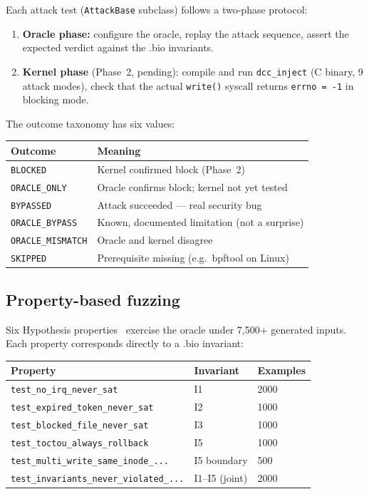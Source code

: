 \documentclass[11pt,a4paper]{article}
\theoremstyle{definition}
\begin{document}
Each attack test (\texttt{AttackBase} subclass) follows a two-phase protocol:

\begin{enumerate}
  \item \textbf{Oracle phase:} configure the oracle, replay the attack sequence,
        assert the expected verdict against the .bio invariants.
  \item \textbf{Kernel phase} (Phase~2, pending): compile and run
        \texttt{dcc\_inject} (C binary, 9 attack modes), check that the actual
        \texttt{write()} syscall returns \texttt{errno = -1} in blocking mode.
\end{enumerate}

The outcome taxonomy has six values:

\begin{center}
\begin{tabular}{ll}
\toprule
Outcome & Meaning \\
\midrule
\texttt{BLOCKED}         & Kernel confirmed block (Phase~2) \\
\texttt{ORACLE\_ONLY}    & Oracle confirms block; kernel not yet tested \\
\texttt{BYPASSED}        & Attack succeeded — real security bug \\
\texttt{ORACLE\_BYPASS}  & Known, documented limitation (not a surprise) \\
\texttt{ORACLE\_MISMATCH}& Oracle and kernel disagree \\
\texttt{SKIPPED}         & Prerequisite missing (e.g.\ bpftool on Linux) \\
\bottomrule
\end{tabular}
\end{center}

\subsection{Property-based fuzzing}

Six Hypothesis properties~\cite{hypothesis} exercise the oracle under 7,500+
generated inputs. Each property corresponds directly to a .bio invariant:

\begin{center}
\begin{tabular}{lll}
\toprule
Property & Invariant & Examples \\
\midrule
\texttt{test\_no\_irq\_never\_sat}            & I1 & 2000 \\
\texttt{test\_expired\_token\_never\_sat}     & I2 & 1000 \\
\texttt{test\_blocked\_file\_never\_sat}      & I3 & 1000 \\
\texttt{test\_toctou\_always\_rollback}       & I5 & 1000 \\
\texttt{test\_multi\_write\_same\_inode\_...} & I5 boundary & 500 \\
\texttt{test\_invariants\_never\_violated\_...} & I1–I5 (joint) & 2000 \\
\bottomrule
\end{tabular}
\end{center}
\end{document}
